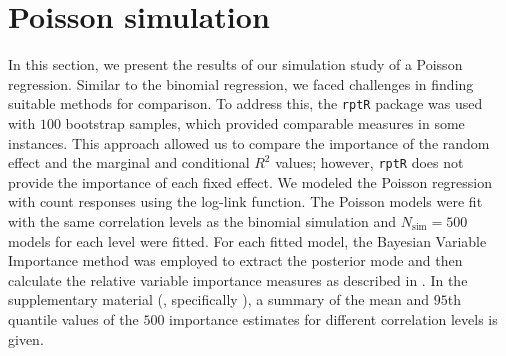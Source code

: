 \section{Poisson simulation}
In this section, we present the results of our simulation study of a Poisson regression. Similar to the binomial regression, we faced challenges in finding suitable methods for comparison. To address this, the \texttt{rptR} package was used with $100$ bootstrap samples, which provided comparable measures in some instances. This approach allowed us to compare the importance of the random effect and the marginal and conditional \( R^2 \) values; however, \texttt{rptR} does not provide the importance of each fixed effect. We modeled the Poisson regression with count responses using the log-link function. The Poisson models were fit with the same correlation levels as the binomial simulation and $N_{\text{sim}}=500$ models for each level were fitted. For each fitted model, the Bayesian Variable Importance method was employed to extract the posterior mode and then calculate the relative variable importance measures as described in . In the supplementary material (, specifically ), a summary of the mean and $95$th quantile values of the $500$ importance estimates for different correlation levels is given.
